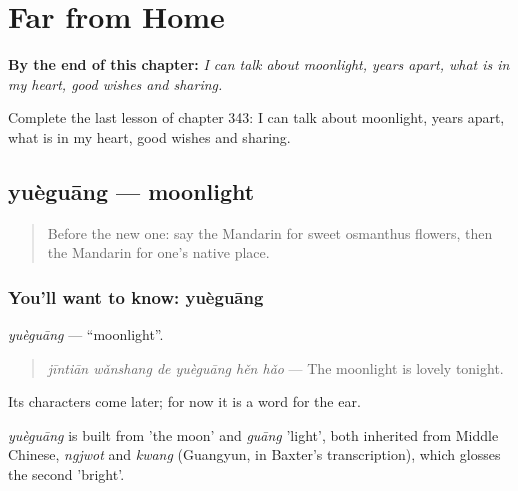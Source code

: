 
\chapter{Far from Home}
\label{ch:zh-far-from-home}

\begin{chapteropening}
\textbf{By the end of this chapter:} \emph{I can talk about moonlight, years apart, what is in my heart, good wishes and sharing.}

Complete the last lesson of chapter 343: I can talk about moonlight, years apart, what is in my heart, good wishes and sharing.
\end{chapteropening}

\section[yuèguāng]{yuèguāng — moonlight}

\label{lesson:ZH-C343-yueguang}



\begin{quote}
Before the new one: say the Mandarin for sweet osmanthus flowers, then the Mandarin for one's native place.
\end{quote}

\subsection*{You'll want to know: yuèguāng}
\emph{yuèguāng} — \textquotedblleft{}moonlight\textquotedblright{}.

\begin{quote}
\emph{jīntiān wǎnshang de yuèguāng hěn hǎo} — The moonlight is lovely tonight.
\end{quote}

Its characters come later; for now it is a word for the ear.

\begin{cousinweb}
\emph{yuèguāng} is built from  'the moon' and \emph{guāng} 'light', both inherited from Middle Chinese, \emph{ngjwot} and \emph{kwang} (Guangyun, in Baxter's transcription), which glosses the second 'bright'.
\end{cousinweb}

